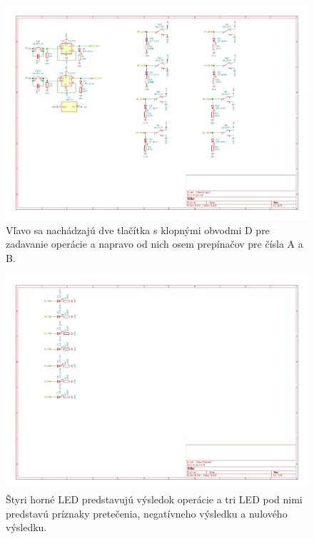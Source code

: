 \documentclass{article}
\begin{document}
    \begin{figure}[h!]
        \centering
        \includegraphics[width=.9\linewidth]{input_sheet.pdf}
        \caption{Vľavo sa nachádzajú dve tlačítka s klopnými obvodmi D pre zadavanie operácie a napravo od nich osem prepínačov pre čísla A a B.}
    \end{figure}

    \begin{figure}[h!]
        \centering
        \includegraphics[width=.9\linewidth]{output_sheet.pdf}
        \caption{Štyri horné LED predstavujú výsledok operácie a tri LED pod nimi predstavú príznaky pretečenia, negatívneho výsledku a nulového výsledku.}
    \end{figure}
\end{document}
